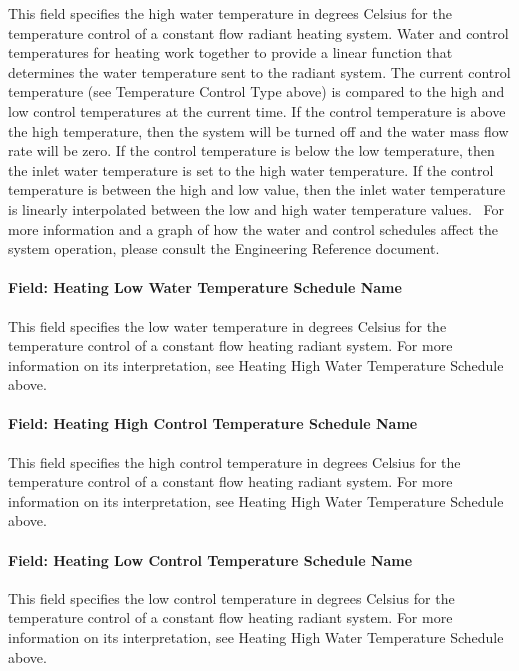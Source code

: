 This field specifies the high water temperature in degrees Celsius for the temperature control of a constant flow radiant heating system. Water and control temperatures for heating work together to provide a linear function that determines the water temperature sent to the radiant system. The current control temperature (see Temperature Control Type above) is compared to the high and low control temperatures at the current time. If the control temperature is above the high temperature, then the system will be turned off and the water mass flow rate will be zero. If the control temperature is below the low temperature, then the inlet water temperature is set to the high water temperature. If the control temperature is between the high and low value, then the inlet water temperature is linearly interpolated between the low and high water temperature values.~ For more information and a graph of how the water and control schedules affect the system operation, please consult the Engineering Reference document.

\paragraph{Field: Heating Low Water Temperature Schedule Name}\label{field-heating-low-water-temperature-schedule-name}

This field specifies the low water temperature in degrees Celsius for the temperature control of a constant flow heating radiant system. For more information on its interpretation, see Heating High Water Temperature Schedule above.

\paragraph{Field: Heating High Control Temperature Schedule Name}\label{field-heating-high-control-temperature-schedule-name}

This field specifies the high control temperature in degrees Celsius for the temperature control of a constant flow heating radiant system. For more information on its interpretation, see Heating High Water Temperature Schedule above.

\paragraph{Field: Heating Low Control Temperature Schedule Name}\label{field-heating-low-control-temperature-schedule-name}

This field specifies the low control temperature in degrees Celsius for the temperature control of a constant flow heating radiant system. For more information on its interpretation, see Heating High Water Temperature Schedule above.

